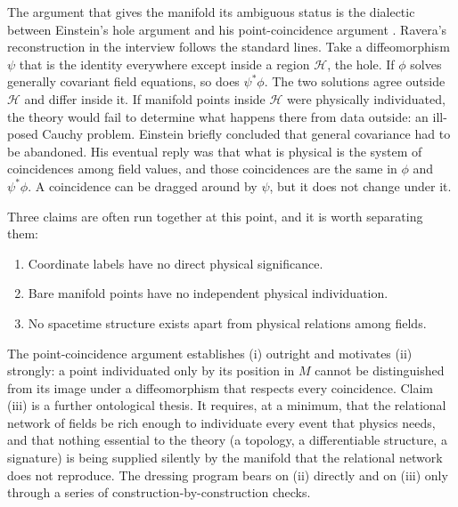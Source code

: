 \documentclass[11pt]{article}
\theoremstyle{plain}
\theoremstyle{definition}
\theoremstyle{remark}
\begin{document}
The argument that gives the manifold its ambiguous status is the dialectic between Einstein's hole argument and his point-coincidence argument \cite{einstein1916,earman-norton,norton-sep}. Ravera's reconstruction in the interview follows the standard lines. Take a diffeomorphism $\psi$ that is the identity everywhere except inside a region $\mathcal H$, the hole. If $\phi$ solves generally covariant field equations, so does $\psi^*\phi$. The two solutions agree outside $\mathcal H$ and differ inside it. If manifold points inside $\mathcal H$ were physically individuated, the theory would fail to determine what happens there from data outside: an ill-posed Cauchy problem. Einstein briefly concluded that general covariance had to be abandoned. His eventual reply was that what is physical is the system of coincidences among field values, and those coincidences are the same in $\phi$ and $\psi^*\phi$. A coincidence can be dragged around by $\psi$, but it does not change under it.

Three claims are often run together at this point, and it is worth separating them:
\begin{enumerate}[label=(\roman*)]
\item Coordinate labels have no direct physical significance.
\item Bare manifold points have no independent physical individuation.
\item No spacetime structure exists apart from physical relations among fields.
\end{enumerate}
The point-coincidence argument establishes (i) outright and motivates (ii) strongly: a point individuated only by its position in $M$ cannot be distinguished from its image under a diffeomorphism that respects every coincidence. Claim (iii) is a further ontological thesis. It requires, at a minimum, that the relational network of fields be rich enough to individuate every event that physics needs, and that nothing essential to the theory (a topology, a differentiable structure, a signature) is being supplied silently by the manifold that the relational network does not reproduce. The dressing program bears on (ii) directly and on (iii) only through a series of construction-by-construction checks.
\end{document}

